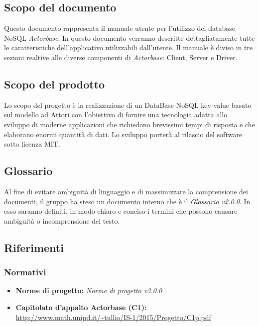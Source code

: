 \documentclass[a4paper]{article}
\begin{document}
	\subsection{Scopo del documento}
		Questo documento rappresenta il manuale utente per l'utilizzo del database NoSQL \emph{Actorbase}. In questo documento verranno descritte dettagliatamente tutte le caratteristiche dell’applicativo utilizzabili dall’utente. Il manuale è diviso in tre sezioni realtive alle diverse componenti di \emph{Actorbase}: Client, Server e Driver.
	\subsection{Scopo del prodotto}
		Lo scopo del progetto è la realizzazione di un DataBase NoSQL key-value basato sul modello ad 
		Attori con l'obiettivo di fornire una tecnologia adatta allo sviluppo di moderne 
		applicazioni che richiedono brevissimi tempi di risposta e che elaborano enormi quantità 
		di dati. Lo sviluppo porterà al rilascio del software sotto licenza MIT.
	\subsection{Glossario}
		Al fine di evitare ambiguità di linguaggio e di massimizzare la comprensione dei documenti, il 
      gruppo ha steso un documento interno che è il \emph{Glossario v2.0.0}. In esso saranno definiti, in modo
      chiaro e conciso i termini che possono causare ambiguità o incomprensione del testo.
	\subsection{Riferimenti}
	\subsubsection{Normativi}
		\begin{itemize}
			\item \textbf{Norme di progetto:} \emph{Norme di progetto v3.0.0}
			\item \textbf{Capitolato d'appalto Actorbase (C1):} \\ 
			\url{http://www.math.unipd.it/~tullio/IS-1/2015/Progetto/C1p.pdf}
		\end{itemize}
	\newpage
\end{document}

